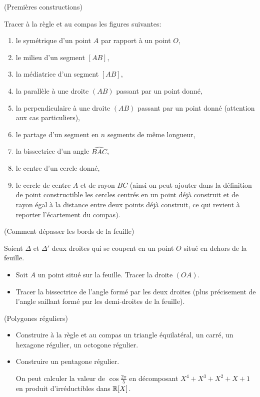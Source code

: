 \documentclass[a4paper,11pt,reqno]{amsart}
\begin{document}
\begin{exo} (Premières constructions)

  Tracer à la règle et au compas les figures suivantes:
  \begin{enumerate}
    \item le symétrique d'un point $A$ par rapport à un point $O$,
    \item le milieu d'un segment $[AB]$,
    \item la médiatrice d'un segment $[AB]$,
    \item la parallèle à une droite $(AB)$ passant par un point donné,
    \item la perpendiculaire à une droite $(AB)$ passant par un point donné (attention aux cas particuliers),
    \item le partage d'un segment en $n$ segments de même longueur,
    \item la bissectrice d'un angle $\widehat{BAC}$,
    \item le centre d'un cercle donné,
    \item le cercle de centre $A$ et de rayon $BC$ (ainsi on peut ajouter dans la définition de point constructible les cercles centrés en un point déjà construit et de rayon égal à la distance entre deux points déjà construit, ce qui revient à reporter l'écartement du compas).
  \end{enumerate}
\end{exo}


\begin{exo}  (Comment dépasser les bords de la feuille)

  Soient $\Delta$ et $\Delta'$ deux droites qui se coupent en un point $O$ situé en dehors de la feuille.
  \begin{itemize}
    \item Soit $A$ un point situé sur la feuille. Tracer la droite $(OA)$.
    \item Tracer la bissectrice de l'angle formé par les deux droites (plus précisement de l'angle saillant formé par les demi-droites de la feuille).
  \end{itemize}

\end{exo}


\begin{exo}  (Polygones réguliers)

  \begin{itemize}
    \item Construire à la règle et au compas un triangle équilatéral, un carré, un hexagone régulier, un octogone régulier.
    \item Construire un pentagone régulier.
    \begin{indication}
      On peut calculer la valeur de $\cos \frac{2\pi}{5}$ en décomposant $X^4+X^3+X^2+X+1$ en produit d'irréductibles dans $\mathbb{R}[X]$.
    \end{indication}
  \end{itemize}
\end{exo}
\end{document}
